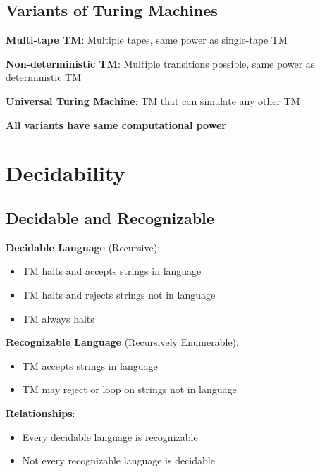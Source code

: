 \documentclass[12pt,a4paper]{report}
\begin{document}
\subsection{Variants of Turing Machines}
\begin{concept}
\textbf{Multi-tape TM}: Multiple tapes, same power as single-tape TM

\textbf{Non-deterministic TM}: Multiple transitions possible, same power as deterministic TM

\textbf{Universal Turing Machine}: TM that can simulate any other TM

\textbf{All variants have same computational power}
\end{concept}

\section{Decidability}

\subsection{Decidable and Recognizable}
\begin{concept}
\textbf{Decidable Language} (Recursive):
\begin{itemize}
    \item TM halts and accepts strings in language
    \item TM halts and rejects strings not in language
    \item TM always halts
\end{itemize}

\textbf{Recognizable Language} (Recursively Enumerable):
\begin{itemize}
    \item TM accepts strings in language
    \item TM may reject or loop on strings not in language
\end{itemize}

\textbf{Relationships}:
\begin{itemize}
    \item Every decidable language is recognizable
    \item Not every recognizable language is decidable
\end{itemize}
\end{concept}
\end{document}
